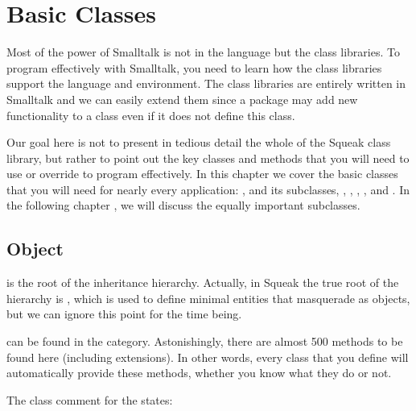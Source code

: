 \documentclass[a4paper,10pt,twoside]{book}
\begin{document}
	\renewcommand{\nnbb}[2]{} %
\fi
\chapter{Basic Classes}
\label{cha:basic}

Most of the power of Smalltalk is not in the language but the class libraries.
To program effectively with Smalltalk, you need to learn how the class libraries support the language and environment.
The class libraries are entirely written in Smalltalk and we can easily extend them since a package may add new functionality to a class even if it does not define this class.

Our goal here is not to present in tedious detail the whole of the Squeak class library, but rather to point out the key classes and methods that you will need to use or override to program effectively.
In this chapter we cover the basic classes that you will need for nearly every application: ,  and its subclasses, , , , , and .
In the following chapter , we will discuss the equally important  subclasses.


\section{Object}
 is the root of the inheritance hierarchy.
Actually, in Squeak the true root of the hierarchy is , which is used to define minimal entities that masquerade as objects, but we can ignore this point for the time being.

 can be found in the  category.
Astonishingly, there are almost 500 methods to be found here (including extensions).
In other words, every class that you define will automatically provide these methods, whether you know what they do or not.

The class comment for the  states:
\end{document}
